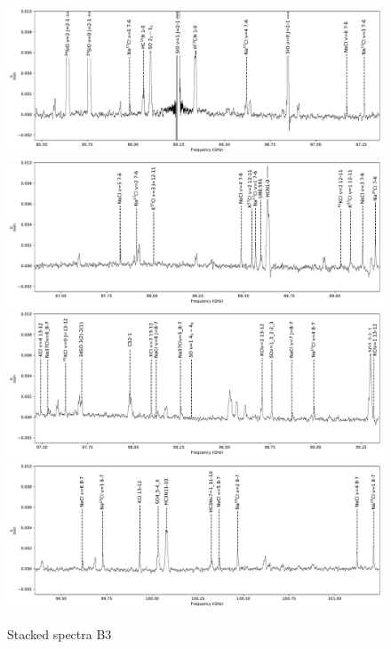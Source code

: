 \documentclass[twocolumn]{aastex62}
\begin{document}
\begin{figure}[!htp]
\includegraphics[scale=1,width=5.5in]{figures/lines_labeled_OrionSourceI_B3_spw0_robust0.5.pdf}
\includegraphics[scale=1,width=5.5in]{figures/lines_labeled_OrionSourceI_B3_spw1_robust0.5.pdf}
\includegraphics[scale=1,width=5.5in]{figures/lines_labeled_OrionSourceI_B3_spw2_robust0.5.pdf}
\includegraphics[scale=1,width=5.5in]{figures/lines_labeled_OrionSourceI_B3_spw3_robust0.5.pdf}
\caption{Stacked spectra  B3}
\label{fig:spectrab3}
\end{figure}
\end{document}
